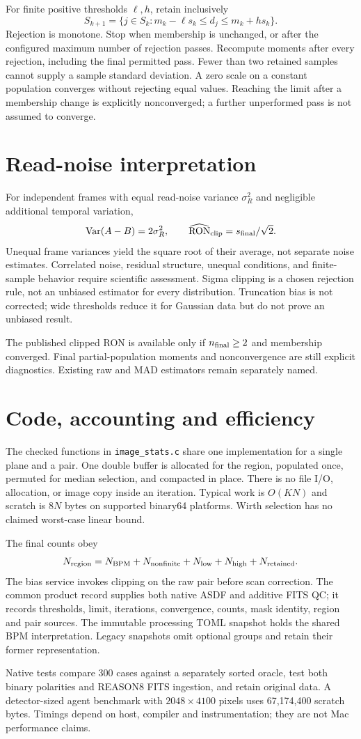 \documentclass[11pt,a4paper]{article}
\begin{document}
For finite positive thresholds $\ell,h$, retain inclusively
\[
 S_{k+1}=\{j\in S_k:m_k-\ell s_k\leq d_j\leq m_k+h s_k\}.
\]
Rejection is monotone. Stop when membership is unchanged, or after the configured maximum number of rejection passes. Recompute moments after every rejection, including the final permitted pass. Fewer than two retained samples cannot supply a sample standard deviation. A zero scale on a constant population converges without rejecting equal values. Reaching the limit after a membership change is explicitly nonconverged; a further unperformed pass is not assumed to converge.
\section{Read-noise interpretation}
For independent frames with equal read-noise variance $\sigma_R^2$ and negligible additional temporal variation,
\[
 \operatorname{Var}(A-B)=2\sigma_R^2,\qquad
 \widehat{\mathrm{RON}}_{\rm clip}=s_{\rm final}/\sqrt{2}.
\]
Unequal frame variances yield the square root of their average, not separate noise estimates. Correlated noise, residual structure, unequal conditions, and finite-sample behavior require scientific assessment. Sigma clipping is a chosen rejection rule, not an unbiased estimator for every distribution. Truncation bias is not corrected; wide thresholds reduce it for Gaussian data but do not prove an unbiased result.

The published clipped RON is available only if $n_{\rm final}\geq2$ and membership converged. Final partial-population moments and nonconvergence are still explicit diagnostics. Existing raw and MAD estimators remain separately named.
\section{Code, accounting and efficiency}
The checked functions in \texttt{image\_stats.c} share one implementation for a single plane and a pair. One double buffer is allocated for the region, populated once, permuted for median selection, and compacted in place. There is no file I/O, allocation, or image copy inside an iteration. Typical work is $O(KN)$ and scratch is $8N$ bytes on supported binary64 platforms. Wirth selection has no claimed worst-case linear bound.

The final counts obey
\[
 N_{\rm region}=N_{\rm BPM}+N_{\rm nonfinite}+N_{\rm low}+N_{\rm high}+N_{\rm retained}.
\]
The bias service invokes clipping on the raw pair before scan correction. The common product record supplies both native ASDF and additive FITS QC; it records thresholds, limit, iterations, convergence, counts, mask identity, region and pair sources. The immutable processing TOML snapshot holds the shared BPM interpretation. Legacy snapshots omit optional groups and retain their former representation.

Native tests compare 300 cases against a separately sorted oracle, test both binary polarities and REASON8 FITS ingestion, and retain original data. A detector-sized agent benchmark with $2048\times4100$ pixels uses 67,174,400 scratch bytes. Timings depend on host, compiler and instrumentation; they are not Mac performance claims.
\end{document}
